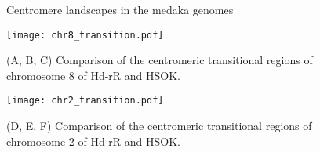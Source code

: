 \begin{figure}[p]
  \centering
  \caption{
    Centromere landscapes in the medaka genomes
  }
  \label{centromere_landscape}
\end{figure}


\begin{figure}[p]
  \centering
  \texttt{[image: chr8\_transition.pdf]}
  \caption{
    (A, B, C) Comparison of the centromeric transitional regions of chromosome 8 of Hd-rR and HSOK.
  }
  \label{other_chroms_transition}
\end{figure}

\addtocounter{figure}{-1}
\begin{figure}[p]
  \centering
  \texttt{[image: chr2\_transition.pdf]}
  \caption{
    (D, E, F) Comparison of the centromeric transitional regions of chromosome 2 of Hd-rR and HSOK.
  }
\end{figure}
